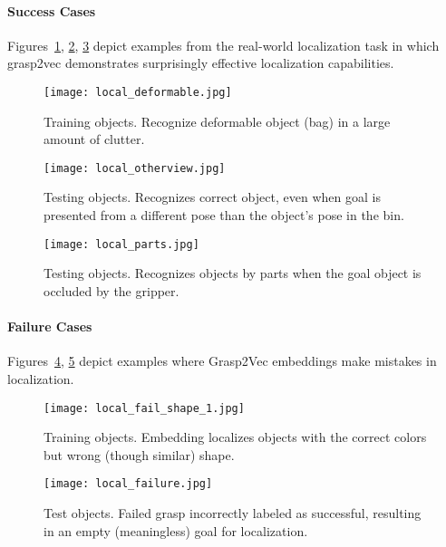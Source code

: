 \documentclass{article}
\begin{document}
\paragraph{Success Cases}
Figures~\ref{fig:localize_deformable}, \ref{fig:localize_diff_pose}, \ref{fig:localize_parts} depict examples from the real-world localization task in which grasp2vec demonstrates surprisingly effective localization capabilities.

\begin{figure}[H]
\centering
\texttt{[image: local\_deformable.jpg]}
\caption{Training objects. Recognize deformable object (bag) in a large amount of clutter.}
\label{fig:localize_deformable}
\end{figure}

\begin{figure}[H]
\centering
\texttt{[image: local\_otherview.jpg]}
\caption{Testing objects. Recognizes correct object, even when goal is presented from a different pose than the object's pose in the bin.}
\label{fig:localize_diff_pose}
\end{figure}

\begin{figure}[H]
\centering
\texttt{[image: local\_parts.jpg]}
\caption{Testing objects. Recognizes objects by parts when the goal object is occluded by the gripper.}
\label{fig:localize_parts}
\end{figure}

\paragraph{Failure Cases}
Figures~\ref{fig:localize_fail}, \ref{fig:localize_misgrasp} depict examples where Grasp2Vec embeddings make mistakes in localization.

\begin{figure}[H]
\centering
\texttt{[image: local\_fail\_shape\_1.jpg]}
\caption{Training objects. Embedding localizes objects with the correct colors but wrong (though similar) shape.}
\label{fig:localize_fail}
\end{figure}

\begin{figure}[H]
\centering
\texttt{[image: local\_failure.jpg]}
\caption{Test objects. Failed grasp incorrectly labeled as successful, resulting in an empty (meaningless) goal for localization.}
\label{fig:localize_misgrasp}
\end{figure}
\end{document}
